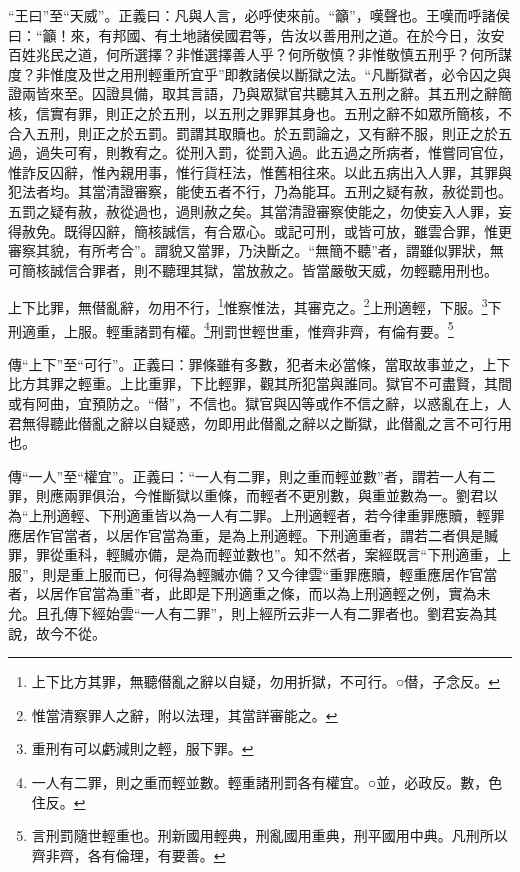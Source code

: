 {\noindent\shu{}\fzkt “王曰”至“天威”。正義曰：凡與人言，必呼使來前。“籲”，嘆聲也。王嘆而呼諸侯曰：“籲！來，有邦國、有土地諸侯國君等，告汝以善用刑之道。在於今日，汝安百姓兆民之道，何所選擇？非惟選擇善人乎？何所敬慎？非惟敬慎五刑乎？何所謀度？非惟度及世之用刑輕重所宜乎”即教諸侯以斷獄之法。“凡斷獄者，必令囚之與證兩皆來至。囚證具備，取其言語，乃與眾獄官共聽其入五刑之辭。其五刑之辭簡核，信實有罪，則正之於五刑，以五刑之罪罪其身也。五刑之辭不如眾所簡核，不合入五刑，則正之於五罰。罰謂其取贖也。於五罰論之，又有辭不服，則正之於五過，過失可宥，則教宥之。從刑入罰，從罰入過。此五過之所病者，惟嘗同官位，惟詐反囚辭，惟內親用事，惟行貨枉法，惟舊相往來。以此五病出入人罪，其罪與犯法者均。其當清證審察，能使五者不行，乃為能耳。五刑之疑有赦，赦從罰也。五罰之疑有赦，赦從過也，過則赦之矣。其當清證審察使能之，勿使妄入人罪，妄得赦免。既得囚辭，簡核誠信，有合眾心。或記可刑，或皆可放，雖雲合罪，惟更審察其貌，有所考合”。謂貌又當罪，乃決斷之。“無簡不聽”者，謂雖似罪狀，無可簡核誠信合罪者，則不聽理其獄，當放赦之。皆當嚴敬天威，勿輕聽用刑也。 \par}

上下比罪，無僣亂辭，勿用不行，\footnote{上下比方其罪，無聽僣亂之辭以自疑，勿用折獄，不可行。○僣，子念反。}惟察惟法，其審克之。\footnote{惟當清察罪人之辭，附以法理，其當詳審能之。}上刑適輕，下服。\footnote{重刑有可以虧減則之輕，服下罪。}下刑適重，上服。輕重諸罰有權。\footnote{一人有二罪，則之重而輕並數。輕重諸刑罰各有權宜。○並，必政反。數，色住反。}刑罰世輕世重，惟齊非齊，有倫有要。\footnote{言刑罰隨世輕重也。刑新國用輕典，刑亂國用重典，刑平國用中典。凡刑所以齊非齊，各有倫理，有要善。}


{\noindent\zhuan{}\fzbyks 傳“上下”至“可行”。正義曰：罪條雖有多數，犯者未必當條，當取故事並之，上下比方其罪之輕重。上比重罪，下比輕罪，觀其所犯當與誰同。獄官不可盡賢，其間或有阿曲，宜預防之。“僣”，不信也。獄官與囚等或作不信之辭，以惑亂在上，人君無得聽此僣亂之辭以自疑惑，勿即用此僣亂之辭以之斷獄，此僣亂之言不可行用也。 \par}

{\noindent\zhuan{}\fzbyks 傳“一人”至“權宜”。正義曰：“一人有二罪，則之重而輕並數”者，謂若一人有二罪，則應兩罪俱治，今惟斷獄以重條，而輕者不更別數，與重並數為一。劉君以為“上刑適輕、下刑適重皆以為一人有二罪。上刑適輕者，若今律重罪應贖，輕罪應居作官當者，以居作官當為重，是為上刑適輕。下刑適重者，謂若二者俱是贓罪，罪從重科，輕贓亦備，是為而輕並數也”。知不然者，案經既言“下刑適重，上服”，則是重上服而已，何得為輕贓亦備？又今律雲“重罪應贖，輕重應居作官當者，以居作官當為重”者，此即是下刑適重之條，而以為上刑適輕之例，實為未允。且孔傳下經始雲“一人有二罪”，則上經所云非一人有二罪者也。劉君妄為其說，故今不從。 \par}

